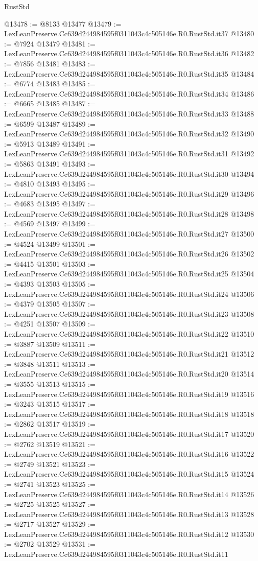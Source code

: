 \begin{lexlean}{RustStd}
\begin{coremodule}
@13478 := @8133 @13477
@13479 := LexLeanPreserve.Cc639d244984595f0311043c4c505146e.R0.RustStd.it37
@13480 := @7924 @13479
@13481 := LexLeanPreserve.Cc639d244984595f0311043c4c505146e.R0.RustStd.it36
@13482 := @7856 @13481
@13483 := LexLeanPreserve.Cc639d244984595f0311043c4c505146e.R0.RustStd.it35
@13484 := @6774 @13483
@13485 := LexLeanPreserve.Cc639d244984595f0311043c4c505146e.R0.RustStd.it34
@13486 := @6665 @13485
@13487 := LexLeanPreserve.Cc639d244984595f0311043c4c505146e.R0.RustStd.it33
@13488 := @6599 @13487
@13489 := LexLeanPreserve.Cc639d244984595f0311043c4c505146e.R0.RustStd.it32
@13490 := @5913 @13489
@13491 := LexLeanPreserve.Cc639d244984595f0311043c4c505146e.R0.RustStd.it31
@13492 := @5863 @13491
@13493 := LexLeanPreserve.Cc639d244984595f0311043c4c505146e.R0.RustStd.it30
@13494 := @4810 @13493
@13495 := LexLeanPreserve.Cc639d244984595f0311043c4c505146e.R0.RustStd.it29
@13496 := @4683 @13495
@13497 := LexLeanPreserve.Cc639d244984595f0311043c4c505146e.R0.RustStd.it28
@13498 := @4569 @13497
@13499 := LexLeanPreserve.Cc639d244984595f0311043c4c505146e.R0.RustStd.it27
@13500 := @4524 @13499
@13501 := LexLeanPreserve.Cc639d244984595f0311043c4c505146e.R0.RustStd.it26
@13502 := @4415 @13501
@13503 := LexLeanPreserve.Cc639d244984595f0311043c4c505146e.R0.RustStd.it25
@13504 := @4393 @13503
@13505 := LexLeanPreserve.Cc639d244984595f0311043c4c505146e.R0.RustStd.it24
@13506 := @4379 @13505
@13507 := LexLeanPreserve.Cc639d244984595f0311043c4c505146e.R0.RustStd.it23
@13508 := @4251 @13507
@13509 := LexLeanPreserve.Cc639d244984595f0311043c4c505146e.R0.RustStd.it22
@13510 := @3887 @13509
@13511 := LexLeanPreserve.Cc639d244984595f0311043c4c505146e.R0.RustStd.it21
@13512 := @3848 @13511
@13513 := LexLeanPreserve.Cc639d244984595f0311043c4c505146e.R0.RustStd.it20
@13514 := @3555 @13513
@13515 := LexLeanPreserve.Cc639d244984595f0311043c4c505146e.R0.RustStd.it19
@13516 := @3243 @13515
@13517 := LexLeanPreserve.Cc639d244984595f0311043c4c505146e.R0.RustStd.it18
@13518 := @2862 @13517
@13519 := LexLeanPreserve.Cc639d244984595f0311043c4c505146e.R0.RustStd.it17
@13520 := @2762 @13519
@13521 := LexLeanPreserve.Cc639d244984595f0311043c4c505146e.R0.RustStd.it16
@13522 := @2749 @13521
@13523 := LexLeanPreserve.Cc639d244984595f0311043c4c505146e.R0.RustStd.it15
@13524 := @2741 @13523
@13525 := LexLeanPreserve.Cc639d244984595f0311043c4c505146e.R0.RustStd.it14
@13526 := @2725 @13525
@13527 := LexLeanPreserve.Cc639d244984595f0311043c4c505146e.R0.RustStd.it13
@13528 := @2717 @13527
@13529 := LexLeanPreserve.Cc639d244984595f0311043c4c505146e.R0.RustStd.it12
@13530 := @2702 @13529
@13531 := LexLeanPreserve.Cc639d244984595f0311043c4c505146e.R0.RustStd.it11

\end{coremodule}
\end{lexlean}
